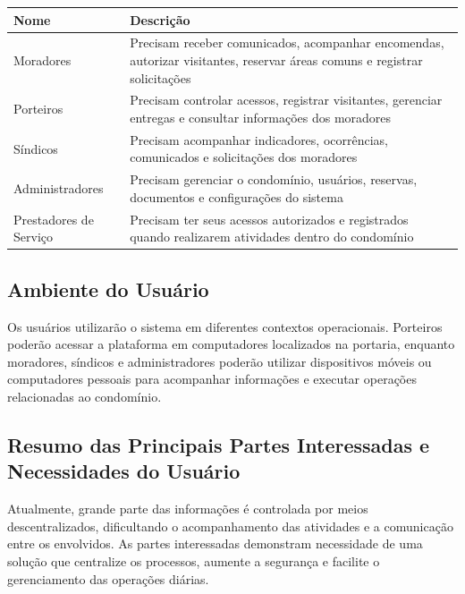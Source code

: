 \begin{table}[h]
    \begin{tabular}{| p{} | p{} | }
        \hline \textbf{Nome} & \textbf{Descrição} \\ \hline

        Moradores &
        Precisam receber comunicados, acompanhar encomendas, autorizar visitantes, reservar áreas comuns e registrar solicitações
        \\
        \hline

        Porteiros &
        Precisam controlar acessos, registrar visitantes, gerenciar entregas e consultar informações dos moradores
        \\
        \hline

        Síndicos &
        Precisam acompanhar indicadores, ocorrências, comunicados e solicitações dos moradores
        \\
        \hline

        Administradores &
        Precisam gerenciar o condomínio, usuários, reservas, documentos e configurações do sistema
        \\
        \hline

        Prestadores de Serviço &
        Precisam ter seus acessos autorizados e registrados quando realizarem atividades dentro do condomínio
        \\
        \hline

    \end{tabular}
\end{table}

\subsection{Ambiente do Usuário}

Os usuários utilizarão o sistema em diferentes contextos operacionais. Porteiros poderão acessar a plataforma em computadores localizados na portaria, enquanto moradores, síndicos e administradores poderão utilizar dispositivos móveis ou computadores pessoais para acompanhar informações e executar operações relacionadas ao condomínio.

\subsection{Resumo das Principais Partes Interessadas e Necessidades do Usuário}

Atualmente, grande parte das informações é controlada por meios descentralizados, dificultando o acompanhamento das atividades e a comunicação entre os envolvidos. As partes interessadas demonstram necessidade de uma solução que centralize os processos, aumente a segurança e facilite o gerenciamento das operações diárias.

